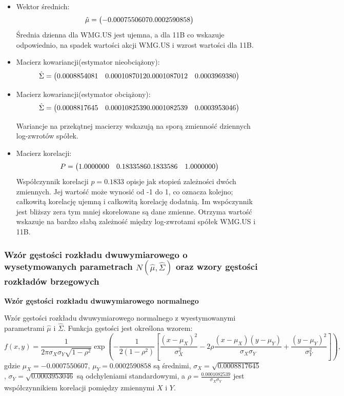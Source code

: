 \documentclass[a4paper,11pt]{article}
\def\\{\hfill\break}
\begin{document}
\begin{itemize}
\item Wektor średnich:
\[
\hat{\mu} = \begin{pmatrix}
-0.0007550607 \\ %
0.0002590858 %
\end{pmatrix}
\]
Średnia dzienna dla WMG.US jest ujemna, a dla 11B co wskazuje odpowiednio, na spadek wartości akcji WMG.US i wzrost wartości dla 11B.

\item Macierz kowariancji(estymator nieobciążony):
\[
\hat{\Sigma} = \begin{pmatrix}
0.0008854081 & 0.0001087012 \\ %
0.0001087012 & 0.0003969380 %
\end{pmatrix}
\]
\item Macierz kowariancji(estymator obciążony):
\[
\hat{\Sigma} = \begin{pmatrix}
0.0008817645 & 0.0001082539 \\ %
0.0001082539 & 0.0003953046 %
\end{pmatrix}
\]

Wariancje na przekątnej macierzy wskazują na sporą zmienność dziennych log-zwrotów spółek. 

\item Macierz korelacji:
\[
P = \begin{pmatrix}
1.0000000 & 0.1833586 \\ %
0.1833586 & 1.0000000 %
\end{pmatrix}
\]
Współczynnik korelacji \(p = 0.1833\) opisje jak stopień zależności dwóch zmiennych. Jej wartość może wynosić od -1 do 1, co oznacza kolejno; całkowitą korelację ujemną i całkowitą korelację dodatnią. Im wspóczynnik jest bliższy zera tym mniej skorelowane są dane zmienne. Otrzyma wartość wskazuje na bardzo słabą zależność między log-zwrotami spółek WMG.US i 11B.
\end{itemize}

\subsubsection{Wzór gęstości rozkładu dwuwymiarowego o wysetymowanych parametrach \( N(\hat{\mu}, \hat{\Sigma}) \) oraz wzory gęstości rozkładów brzegowych}

\textbf{Wzór gęstości rozkładu dwuwymiarowego normalnego}
\smallskip

Wzór gęstości rozkładu dwuwymiarowego normalnego z wyestymowanymi parametrami \( \hat{\mu} \) i \( \hat{\Sigma} \). Funkcja gęstości jest określona wzorem:
\[
f(x, y) = \frac{1}{2\pi\sigma_X\sigma_Y\sqrt{1-\rho^2}} \exp\left(
-\frac{1}{2(1-\rho^2)}\left[
\frac{(x-\mu_X)^2}{\sigma_X^2} - 2\rho\frac{(x-\mu_X)(y-\mu_Y)}{\sigma_X\sigma_Y} + \frac{(y-\mu_Y)^2}{\sigma_Y^2}
\right]
\right),
\]
gdzie \( \mu_X = -0.0007550607 \), \( \mu_Y = 0.0002590858 \) są średnimi, \( \sigma_X = \sqrt{0.0008817645} \), \( \sigma_Y = \sqrt{0.0003953046} \) są odchyleniami standardowymi, a \( \rho = \frac{0.0001082539}{\sigma_X\sigma_Y} \) jest współczynnikiem korelacji pomiędzy zmiennymi \( X \) i \( Y \).
\end{document}
